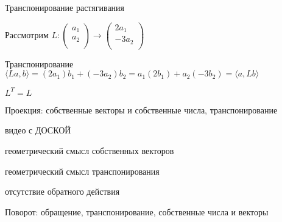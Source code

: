 \documentclass[14pt,xcolor=dvipsnames]{beamer}
\begin{document}
\begin{frame}{Транспонирование растягивания}

Рассмотрим $L : \begin{pmatrix}
  a_1 \\
  a_2 \\
\end{pmatrix} \to
\begin{pmatrix}
  2a_1 \\
  -3a_2 \\
\end{pmatrix}
$
  
\begin{block}{Транспонирование}
$\langle La, b\rangle = (2a_1) b_1 + (-3a_2)b_2 = a_1 (2b_1) + a_2(-3b_2) = \langle a, Lb\rangle$
\end{block}

\begin{block}{$L^T = L$}  
\end{block}

\end{frame}





\begin{frame} %
  
  Проекция: собственные векторы и собственные числа, транспонирование

\end{frame}
  
\begin{frame}{видео с ДОСКОЙ}

\begin{block}{геометрический смысл собственных векторов}
\end{block}

\begin{block}{геометрический смысл транспонирования}
\end{block}

\begin{block}{отсутствие обратного действия}
\end{block}



\end{frame}

\begin{frame} %
  Поворот: обращение, транспонирование, собственные числа и векторы
\end{frame}
  
\end{document}
